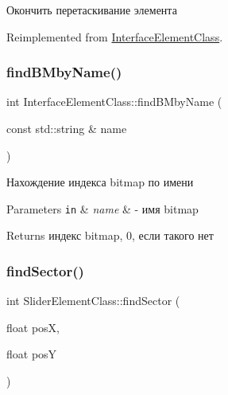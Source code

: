 Окончить перетаскивание элемента 



Reimplemented from \hyperlink{class_interface_element_class_ac92bb66665d96a17c7ab6204adcf03cd}{Interface\+Element\+Class}.

\mbox{\label{class_interface_element_class_aa878a2296a5fe72fb7a92e833f276961}} 
\subsubsection{\texorpdfstring{find\+B\+Mby\+Name()}{findBMbyName()}}
{\footnotesize\ttfamily int Interface\+Element\+Class\+::find\+B\+Mby\+Name (\begin{DoxyParamCaption}\item[{const std\+::string \&}]{name }\end{DoxyParamCaption})\hspace{0.3cm}{\ttfamily [inherited]}}



Нахождение индекса bitmap по имени 


\begin{DoxyParams}[1]{Parameters}
\mbox{\tt in}  & {\em name} & -\/ имя bitmap \\
\hline
\end{DoxyParams}
\begin{DoxyReturn}{Returns}
индекс bitmap, 0, если такого нет 
\end{DoxyReturn}
\mbox{\label{class_slider_element_class_a38976cdbfa4bee454446fd2a621b4584}} 
\subsubsection{\texorpdfstring{find\+Sector()}{findSector()}}
{\footnotesize\ttfamily int Slider\+Element\+Class\+::find\+Sector (\begin{DoxyParamCaption}\item[{float}]{posX,  }\item[{float}]{posY }\end{DoxyParamCaption})}



